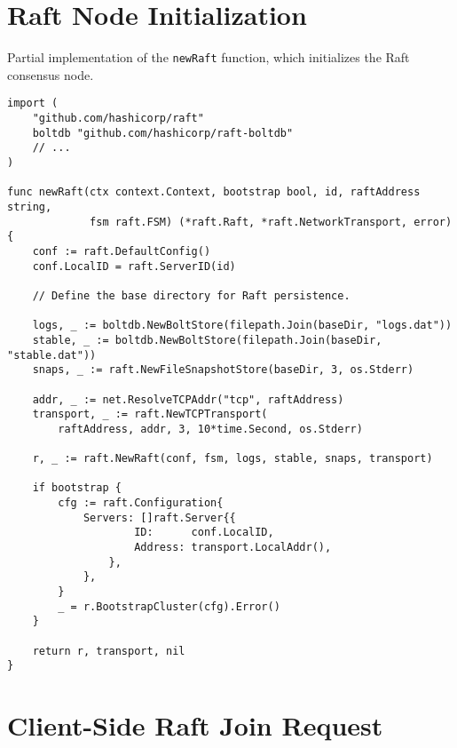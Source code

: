 \section{Raft Node Initialization} \label{code:new-raft-function}

\begin{listing}[H]
\caption{Partial implementation of the \texttt{newRaft} function, which initializes the Raft consensus node.}
\begin{verbatim}
import (
    "github.com/hashicorp/raft"
    boltdb "github.com/hashicorp/raft-boltdb"
    // ...
)

func newRaft(ctx context.Context, bootstrap bool, id, raftAddress string,
             fsm raft.FSM) (*raft.Raft, *raft.NetworkTransport, error) {
    conf := raft.DefaultConfig()
    conf.LocalID = raft.ServerID(id)

    // Define the base directory for Raft persistence.

    logs, _ := boltdb.NewBoltStore(filepath.Join(baseDir, "logs.dat"))
    stable, _ := boltdb.NewBoltStore(filepath.Join(baseDir, "stable.dat"))
    snaps, _ := raft.NewFileSnapshotStore(baseDir, 3, os.Stderr)

    addr, _ := net.ResolveTCPAddr("tcp", raftAddress)
    transport, _ := raft.NewTCPTransport(
        raftAddress, addr, 3, 10*time.Second, os.Stderr)

    r, _ := raft.NewRaft(conf, fsm, logs, stable, snaps, transport)

    if bootstrap {
        cfg := raft.Configuration{
            Servers: []raft.Server{{
                    ID:      conf.LocalID,
                    Address: transport.LocalAddr(),
                },
            },
        }
        _ = r.BootstrapCluster(cfg).Error()
    }

    return r, transport, nil
}
\end{verbatim}
\end{listing}


\section{Client-Side Raft Join Request} \label{code:grpc-call-join-request}


